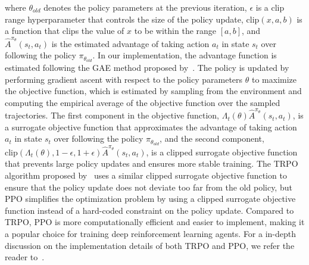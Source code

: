 where $\theta_{old}$ denotes the policy parameters at the previous iteration, $\epsilon$ is a clip range hyperparameter that controls the size of the policy update, $\text{clip}(x, a, b)$ is a function that clips the value of $x$ to be within the range $[a, b]$, and $\hat{A}^{\pi_{\theta}}(s_t, a_t)$ is the estimated advantage of taking action $a_t$ in state $s_t$ over following the policy $\pi_{\theta_{old}}$.
In our implementation, the advantage function is estimated following the GAE method proposed by~\cite{schulman2015high}.
The policy is updated by performing gradient ascent with respect to the policy parameters $\theta$ to maximize the objective function, which is estimated by sampling from the environment and computing the empirical average of the objective function over the sampled trajectories.
The first component in the objective function, $\Lambda_t(\theta) \hat{A}^{\pi_{\theta}}(s_t, a_t)$, is a surrogate objective function that approximates the advantage of taking action $a_t$ in state $s_t$ over following the policy $\pi_{\theta_{old}}$, and the second component, $\text{clip}(\Lambda_t(\theta), 1-\epsilon, 1 + \epsilon) \hat{A}^{\pi_{\theta}}(s_t, a_t)$, is a clipped surrogate objective function that prevents large policy updates and ensures more stable training.
The TRPO algorithm proposed by~\cite{schulman2015trust} uses a similar clipped surrogate objective function to ensure that the policy update does not deviate too far from the old policy, but PPO simplifies the optimization problem by using a clipped surrogate objective function instead of a hard-coded constraint on the policy update.
Compared to TRPO, PPO is more computationally efficient and easier to implement, making it a popular choice for training deep reinforcement learning agents.
For a in-depth discussion on the implementation details of both TRPO and PPO, we refer the reader to~\cite{engstrom2020implementation}.

